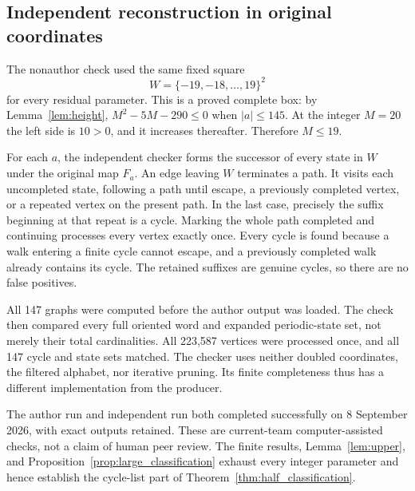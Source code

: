\subsection{Independent reconstruction in original coordinates}

The nonauthor check used the same fixed square
\begin{equation}
 W=\{-19,-18,\ldots,19\}^2
 \label{eq:independent_box}
\end{equation}
for every residual parameter. This is a proved complete box:
by Lemma~\ref{lem:height}, $M^2-5M-290\le0$ when $|a|\le145$.
At the integer $M=20$ the left side is $10>0$, and it increases
thereafter. Therefore $M\le19$.

For each $a$, the independent checker forms the successor of every
state in $W$ under the original map $F_a$. An edge leaving $W$
terminates a path. It visits each uncompleted state, following a
path until escape, a previously completed vertex, or a repeated
vertex on the present path. In the last case, precisely the
suffix beginning at that repeat is a cycle. Marking the whole
path completed and continuing processes every vertex exactly once.
Every cycle is found because a walk entering a finite cycle cannot
escape, and a previously completed walk already contains its cycle.
The retained suffixes are genuine cycles, so there are no false positives.

All 147 graphs were computed before the author output was loaded.
The check then compared every full oriented word and expanded
periodic-state set, not merely their total cardinalities.
All 223,587 vertices were processed once, and all 147 cycle and
state sets matched. The checker uses neither doubled coordinates,
the filtered alphabet, nor iterative pruning. Its finite
completeness thus has a different implementation from the producer.

The author run and independent run both completed successfully on
8 September 2026, with exact outputs retained. These are current-team
computer-assisted checks, not a claim of human peer review.
The finite results, Lemma~\ref{lem:upper}, and
Proposition~\ref{prop:large_classification} exhaust every integer
parameter and hence establish the cycle-list part of
Theorem~\ref{thm:half_classification}.
